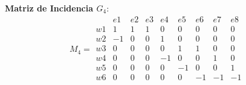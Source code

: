 \documentclass{article}
\begin{document}
\textbf{Matriz de Incidencia \( G_4 \)}:
\[
M_4 =
\begin{array}{c|cccccccc}
    & e1 & e2 & e3 & e4 & e5 & e6 & e7 & e8 \\
\hline
w1 & 1  & 1  & 1  & 0  & 0  & 0  & 0  & 0  \\
w2 & -1 & 0  & 0  & 1  & 0  & 0  & 0  & 0  \\
w3 & 0  & 0  & 0  & 0  & 1  & 1  & 0  & 0  \\
w4 & 0  & 0  & 0  & -1 & 0  & 0  & 1  & 0  \\
w5 & 0  & 0  & 0  & 0  & -1 & 0  & 0  & 1  \\
w6 & 0  & 0  & 0  & 0  & 0  & -1 & -1 & -1 \\
\end{array}
\]
\end{document}
